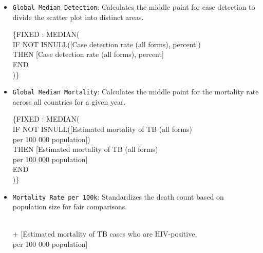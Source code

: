\documentclass[a4paper,12pt]{extarticle}
\begin{document}
\begin{itemize}
    \item \texttt{Global Median Detection}: Calculates the middle point for case detection to divide the scatter plot into distinct areas.
    \begin{center}
    \begin{tcolorbox}[colback=white, colframe=lightblue, width=\linewidth, fontupper=\footnotesize\ttfamily, arc=3pt]
    \{FIXED : MEDIAN( \\
    \hspace*{1em} IF NOT ISNULL([Case detection rate (all forms), percent]) \\
    \hspace*{1em} THEN [Case detection rate (all forms), percent] \\
    \hspace*{1em} END \\
    )\}
    \end{tcolorbox}
    \end{center}
    
    \item \texttt{Global Median Mortality}: Calculates the middle point for the mortality rate across all countries for a given year.
    \begin{center}
    \begin{tcolorbox}[colback=white, colframe=lightblue, width=\linewidth, fontupper=\footnotesize\ttfamily, arc=3pt]
    \{FIXED : MEDIAN( \\
    \hspace*{1em} IF NOT ISNULL([Estimated mortality of TB (all forms) \\
    \hspace*{2em} per 100 000 population]) \\
    \hspace*{1em} THEN [Estimated mortality of TB (all forms) \\
    \hspace*{2em} per 100 000 population] \\
    \hspace*{1em} END \\
    )\}
    \end{tcolorbox}
    \end{center}
    
    \item \texttt{Mortality Rate per 100k}: Standardizes the death count based on population size for fair comparisons.
    \begin{center}
    \begin{tcolorbox} \\
    + [Estimated mortality of TB cases who are HIV-positive, \\
    \hspace*{1em} per 100 000 population]
    \end{tcolorbox}
    \end{center}
    

\end{itemize}
\end{document}
